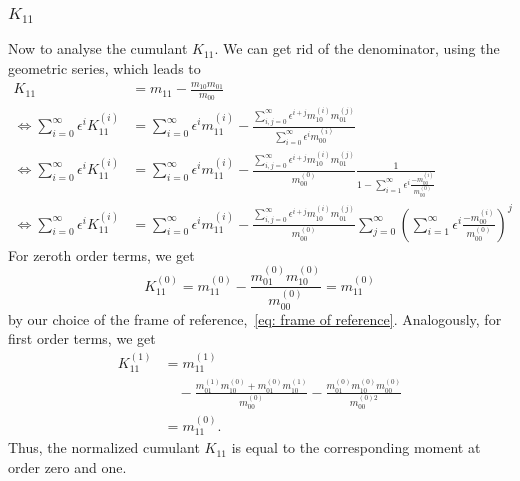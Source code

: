 \documentclass{article}
\begin{document}
\subsubsection{\texorpdfstring{$K_{11}$}{K 11}}
\label{subs:K_11}

Now to analyse the cumulant $K_{11}$. We can get rid of the denominator, using the geometric series, which leads to
\begin{equation}
  \begin{aligned}
    K_{11} & = m_{11} - \frac{m_{10}m_{01}}{m_{00}}\\
    \Leftrightarrow
    \sum_{i=0}^\infty \epsilon^i K_{11}^{(i)}
    & = \sum_{i=0}^\infty \epsilon^i m_{11}^{(i)} -
    \frac{\sum_{i,j=0}^\infty \epsilon^{i+j} m_{10}^{(i)}m_{01}^{(j)}}
        {\sum_{i=0}^\infty \epsilon^i m_{00}^{(i)}}\\
    \Leftrightarrow
    \sum_{i=0}^\infty \epsilon^i K_{11}^{(i)}
    & = \sum_{i=0}^\infty \epsilon^i m_{11}^{(i)} -
    \frac{\sum_{i,j=0}^\infty \epsilon^{i+j} m_{10}^{(i)}m_{01}^{(j)}}
        {m_{00}^{(0)}}
        \frac{1}{1 - \sum_{i=1}^\infty \epsilon^i \frac{ - m_{00}^{(i)}}{ m_{00}^{(0)}}}\\
    \Leftrightarrow
    \sum_{i=0}^\infty \epsilon^i K_{11}^{(i)}
    & = \sum_{i=0}^\infty \epsilon^i m_{11}^{(i)} -
    \frac{\sum_{i,j=0}^\infty \epsilon^{i+j} m_{10}^{(i)}m_{01}^{(j)}}
        {m_{00}^{(0)}}
    \sum_{j=0}^\infty {\left(\sum_{i=1}^\infty \epsilon^i \frac{ - m_{00}^{(i)}}{ m_{00}^{(0)}}\right)}^j
  \end{aligned}
\end{equation}
For zeroth order terms, we get
\begin{equation}
  K_{11}^{(0)} = m_{11}^{(0)} - \frac{m_{01}^{(0)}m_{10}^{(0)}}{m_{00}^{(0)}} = m_{11}^{(0)}
\end{equation}
by our choice of the frame of reference,~\eqref{eq: frame of reference}.
Analogously, for first order terms, we get
\begin{equation}
  \begin{aligned}
    K_{11}^{(1)} & = m_{11}^{(1)} \\
    &\quad - \frac{m_{01}^{(1)}m_{10}^{(0)}+m_{01}^{(0)}m_{10}^{(1)}}{m_{00}^{(0)}}
    -\frac{m_{01}^{(0)}m_{10}^{(0)}m_{00}^{(0)}}{m_{00}^{(0)2}}  \\
    &= m_{11}^{(0)}.
  \end{aligned}
\end{equation}
Thus, the normalized cumulant $K_{11}$ is equal to the corresponding moment at order zero and one.
\end{document}
